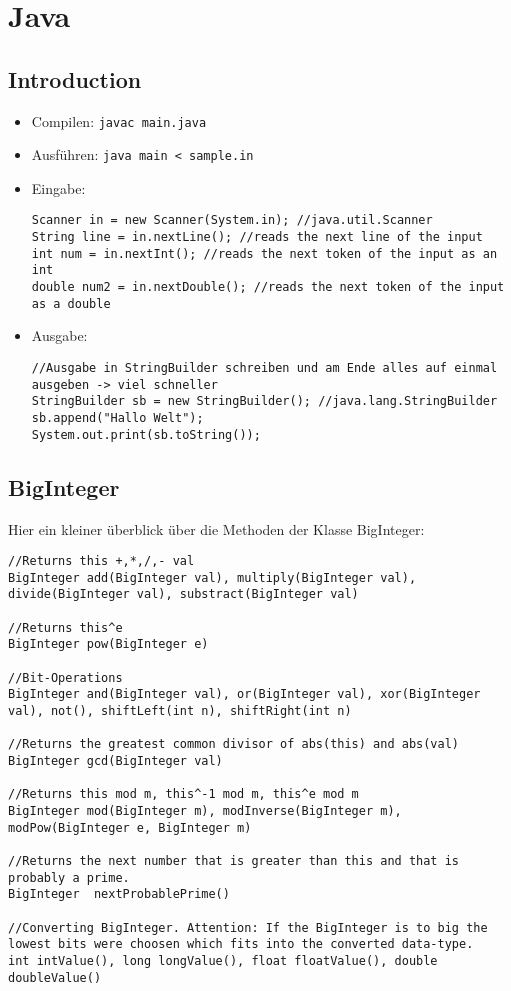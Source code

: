 \section{Java}
\lstset{language=Java}

\subsection{Introduction}

\begin{itemize}
\item Compilen: \lstinline{javac main.java}
\item Ausführen: \lstinline{java main < sample.in}
\item Eingabe:
\begin{lstlisting}
Scanner in = new Scanner(System.in); //java.util.Scanner
String line = in.nextLine(); //reads the next line of the input
int num = in.nextInt(); //reads the next token of the input as an int
double num2 = in.nextDouble(); //reads the next token of the input as a double
\end{lstlisting}
\item Ausgabe:
\begin{lstlisting}
//Ausgabe in StringBuilder schreiben und am Ende alles auf einmal ausgeben -> viel schneller
StringBuilder sb = new StringBuilder(); //java.lang.StringBuilder
sb.append("Hallo Welt");
System.out.print(sb.toString());
\end{lstlisting}
\end{itemize}

\subsection{BigInteger}
Hier ein kleiner überblick über die Methoden der Klasse BigInteger:
\begin{lstlisting}
//Returns this +,*,/,- val
BigInteger add(BigInteger val), multiply(BigInteger val), divide(BigInteger val), substract(BigInteger val)

//Returns this^e
BigInteger pow(BigInteger e)

//Bit-Operations
BigInteger and(BigInteger val), or(BigInteger val), xor(BigInteger val), not(), shiftLeft(int n), shiftRight(int n)

//Returns the greatest common divisor of abs(this) and abs(val)
BigInteger gcd(BigInteger val)

//Returns this mod m, this^-1 mod m, this^e mod m
BigInteger mod(BigInteger m), modInverse(BigInteger m), modPow(BigInteger e, BigInteger m)

//Returns the next number that is greater than this and that is probably a prime.
BigInteger  nextProbablePrime()

//Converting BigInteger. Attention: If the BigInteger is to big the lowest bits were choosen which fits into the converted data-type.
int intValue(), long longValue(), float floatValue(), double doubleValue() 
\end{lstlisting}
\lstset{language=C++}